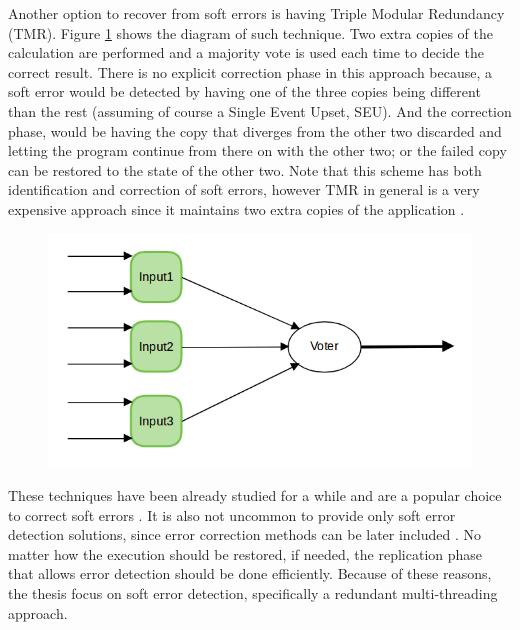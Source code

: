 Another option to recover from soft errors is having Triple Modular Redundancy (TMR). Figure \ref{fig:TripleModularRedundancy} shows the diagram of such technique. Two extra copies of the calculation are performed and a majority vote is used each time to decide the correct result. There is no explicit correction phase in this approach because, a soft error would be detected by having one of the three copies being different than the rest (assuming of course a Single Event Upset, SEU). And the correction phase, would be having the copy that diverges from the other two discarded and letting the program continue from there on with the other two; or the failed copy can be restored to the state of the other two. Note that this scheme has both identification and correction of soft errors, however TMR in general is a very expensive approach since it maintains two extra copies of the application \cite{calhoun2017towards}. 

\begin{figure}[h]
	\centering
	\includegraphics[scale=0.5]{images/TripleModularRedundancy.png}
	\label{fig:TripleModularRedundancy}
\end{figure}

These techniques have been already studied for a while and are a popular choice to correct soft errors \cite{kuvaiskii2016haft} \cite{kuvaiskii2016elzar}. It is also not uncommon to provide only soft error detection solutions, since error correction methods can be later included \cite{mitropoulou2016comet} \cite{wang2007compiler} \cite{zhang2012daft}. No matter how the execution should be restored, if needed, the replication phase that allows error detection should be done efficiently. Because of these reasons, the thesis focus on soft error detection, specifically a redundant multi-threading approach. 

